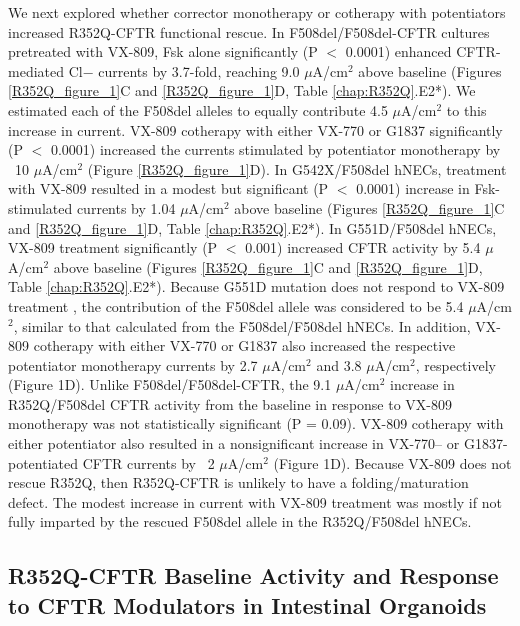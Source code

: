 	We next explored whether corrector monotherapy or cotherapy with potentiators increased R352Q-CFTR functional rescue. In F508del/F508del-CFTR cultures pretreated with VX-809, Fsk alone significantly (P $<$ 0.0001) enhanced CFTR-mediated Cl− currents by 3.7-fold, reaching 9.0 $\mu$A/cm$^2$ above baseline (Figures \ref{R352Q_figure_1}C and \ref{R352Q_figure_1}D, Table \ref{chap:R352Q}.E2*). We estimated each of the F508del alleles to equally contribute 4.5 $\mu$A/cm$^2$ to this increase in current. VX-809 cotherapy with either VX-770 or G1837 significantly (P $<$ 0.0001) increased the currents stimulated by potentiator monotherapy by ~10 $\mu$A/cm$^2$ (Figure \ref{R352Q_figure_1}D). In G542X/F508del hNECs, treatment with VX-809 resulted in a modest but significant (P $<$ 0.0001) increase in Fsk-stimulated currents by 1.04 $\mu$A/cm$^2$ above baseline (Figures \ref{R352Q_figure_1}C and \ref{R352Q_figure_1}D, Table \ref{chap:R352Q}.E2*). In G551D/F508del hNECs, VX-809 treatment significantly (P $<$ 0.001) increased CFTR activity by 5.4 $\mu$A/cm$^2$ above baseline (Figures \ref{R352Q_figure_1}C and \ref{R352Q_figure_1}D, Table \ref{chap:R352Q}.E2*). Because G551D mutation does not respond to VX-809 treatment \cite{han2018}, the contribution of the F508del allele was considered to be 5.4 $\mu$A/cm$^2$, similar to that calculated from the F508del/F508del hNECs. In addition, VX-809 cotherapy with either VX-770 or G1837 also increased the respective potentiator monotherapy currents by 2.7 $\mu$A/cm$^2$ and 3.8 $\mu$A/cm$^2$, respectively (Figure 1D). Unlike F508del/F508del-CFTR, the 9.1 $\mu$A/cm$^2$ increase in R352Q/F508del CFTR activity from the baseline in response to VX-809 monotherapy was not statistically significant (P = 0.09). VX-809 cotherapy with either potentiator also resulted in a nonsignificant increase in VX-770– or G1837-potentiated CFTR currents by ~2 $\mu$A/cm$^2$ (Figure 1D). Because VX-809 does not rescue R352Q, then R352Q-CFTR is unlikely to have a folding/maturation defect. The modest increase in current with VX-809 treatment was mostly if not fully imparted by the rescued F508del allele in the R352Q/F508del hNECs.

\subsection{R352Q-CFTR Baseline Activity and Response to CFTR Modulators in Intestinal Organoids}

